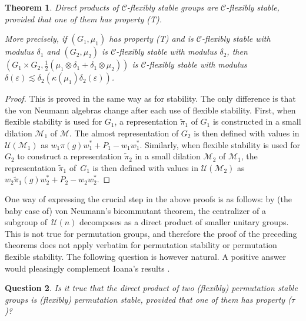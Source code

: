\documentclass[JEP,XML,SOM,Unicode,published]{cedram}
\theoremstyle{plain}
\newtheorem{theorem}{Theorem}[section]
\newtheorem{question}[theorem]{Question}
\theoremstyle{definition}
\newcommand{\cM}{\mathcal{M}}
\newcommand{\vn}{\mathcal{C}}
\newcommand{\cU}{\mathcal{U}}
\begin{document}
\begin{theorem}\label{thm:flexible_stability_direct_product} Direct products of $\vn$-flexibly stable groups are $\vn$-flexibly stable, provided that one of them has property (T).

More precisely, if $(G_1,\mu_1)$ has property (T) and is $\vn$-flexibly stable with modulus $\delta_1$ and $(G_2,\mu_2)$ is $\vn$-flexibly stable with modulus $\delta_2$, then $(G_1 \times G_2,\frac{1}{2}(\mu_1 \otimes \delta_1 + \delta_1 \otimes \mu_2))$ is $\vn$-flexibly stable with modulus $\delta(\varepsilon) \lesssim \delta_2(\kappa(\mu_1) \delta_2(\varepsilon))$.
\end{theorem}
\begin{proof}
This is proved in the same way as for stability. The only difference is that the von Neumann algebras change after each use of flexible stability. First, when flexible stability is used for $G_1$, a representation $\tilde{\pi}_1$ of $G_1$ is constructed in a small dilation $\cM_1$ of $\cM$. The almost representation of $G_2$ is then defined with values in $\cU(\cM_1)$ as $w_1 \pi(g) w_1^* +P_1 - w_1w_1^*$. Similarly, when flexible stability is used for $G_2$ to construct a representation $\tilde{\pi}_2$ in a small dilation $\cM_2$ of $\cM_1$, the representation $\tilde{\pi}_1$ of~$G_1$ is then defined with values in $\cU(\cM_2)$ as
$w_2 \tilde{\pi}_1(g) w_2^* +P_2 - w_2w_2^*$.
\end{proof}

One way of expressing the crucial step in the above proofs is as follows: by (the baby case of) von Neumann's bicommutant theorem, the centralizer of a subgroup of~$\cU(n)$ decomposes as a direct product of smaller unitary groups. This is not true for permutation groups, and therefore the proof of the preceding theorems does not apply verbatim for permutation stability or permutation flexible stability. The following question is however natural. A positive answer would pleasingly complement Ioana's results \cite{MR4134896}.

\begin{question}
Is it true that the direct product of two (flexibly) permutation stable groups is (flexibly) permutation stable, provided that one of them has property ($\tau$)?
\end{question}

\backmatter


\end{document}
